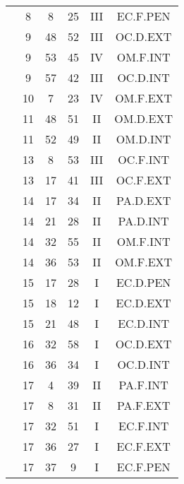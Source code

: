 \documentclass[12pt, a4paper]{article}
\begin{document}
\begin{multicols}{3}
{\begin{tabular}{c c c c c c}
	 	 	 	 & 8 & 8 & 25 & III & EC.F.PEN\\%
	 	 	 	 & 9 & 48 & 52 & III & OC.D.EXT\\%
	 	 	 	 & 9 & 53 & 45 & IV & OM.F.INT\\%
	 	 	 	 & 9 & 57 & 42 & III & OC.D.INT\\%
	 	 	 	 & 10 & 7 & 23 & IV & OM.F.EXT\\%
	 	 	 	 & 11 & 48 & 51 & II & OM.D.EXT\\%
	 	 	 	 & 11 & 52 & 49 & II & OM.D.INT\\%
	 	 	 	 & 13 & 8 & 53 & III & OC.F.INT\\%
	 	 	 	 & 13 & 17 & 41 & III & OC.F.EXT\\%
	 	 	 	 & 14 & 17 & 34 & II & PA.D.EXT\\%
	 	 	 	 & 14 & 21 & 28 & II & PA.D.INT\\%
	 	 	 	 & 14 & 32 & 55 & II & OM.F.INT\\%
	 	 	 	 & 14 & 36 & 53 & II & OM.F.EXT\\%
	 	 	 	 & 15 & 17 & 28 & I & EC.D.PEN\\%
	 	 	 	 & 15 & 18 & 12 & I & EC.D.EXT\\%
	 	 	 	 & 15 & 21 & 48 & I & EC.D.INT\\%
	 	 	 	 & 16 & 32 & 58 & I & OC.D.EXT\\%
	 	 	 	 & 16 & 36 & 34 & I & OC.D.INT\\%
	 	 	 	 & 17 & 4 & 39 & II & PA.F.INT\\%
	 	 	 	 & 17 & 8 & 31 & II & PA.F.EXT\\%
	 	 	 	 & 17 & 32 & 51 & I & EC.F.INT\\%
	 	 	 	 & 17 & 36 & 27 & I & EC.F.EXT\\%
	 	 	 	 & 17 & 37 & 9 & I & EC.F.PEN\\%

\end{tabular}}
\end{multicols}
\end{document}
